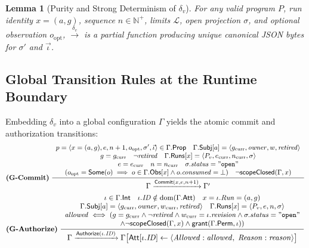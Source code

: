 \documentclass[11pt,a4paper]{article}
\newtheorem{lemma}[theorem]{Lemma}
\theoremstyle{definition}
\theoremstyle{remark}
\newcommand{\Obs}{\mathsf{Obs}}
\newcommand{\Subj}{\mathsf{Subj}}
\begin{document}
\begin{lemma}[Purity and Strong Determinism of $\delta_v$]
\label{lem:determinism}
For any valid program $P$, run identity $x = (a,g)$, sequence $n \in \mathbb{N}^+$, limits $\mathcal{L}$, open projection $\sigma$, and optional observation $o_{\text{opt}}$, $\xrightarrow{\delta_v}$ is a partial function producing unique canonical JSON bytes for $\sigma'$ and $\vec{\iota}$.
\end{lemma}

\subsection{Global Transition Rules at the Runtime Boundary}
Embedding $\delta_v$ into a global configuration $\Gamma$ yields the atomic commit and authorization transitions:
\[
\small\textbf{(G-Commit)} \; \frac{
  \begin{array}{c}
    p = \langle x=(a,g), e, n+1, o_{\text{opt}}, \sigma', \vec{\iota} \rangle \in \Gamma.\mathsf{Prop} \quad \Gamma.\Subj[a] = \langle g_{\text{curr}}, \mathit{owner}, w, \mathit{retired} \rangle \\
    g = g_{\text{curr}} \quad \neg \mathit{retired} \quad \Gamma.\mathsf{Runs}[x] = \langle P_v, e_{\text{curr}}, n_{\text{curr}}, \sigma \rangle \\
    e = e_{\text{curr}} \quad n = n_{\text{curr}} \quad \sigma.\mathit{status} = \mathtt{"open"} \\
    (o_{\text{opt}} = \mathsf{Some}(o) \implies o \in \Gamma.\Obs[x] \land o.\mathit{consumed} = \bot) \quad \neg \mathsf{scopeClosed}(\Gamma, x)
  \end{array}
}{
  \Gamma \xrightarrow{\;\mathsf{Commit}(x, e, n+1)\;} \Gamma'
}
\]
\[
\small\textbf{(G-Authorize)} \; \frac{
  \begin{array}{c}
    \iota \in \Gamma.\mathsf{Int} \quad \iota.\mathit{ID} \notin \operatorname{dom}(\Gamma.\mathsf{Att}) \quad x = \iota.\mathit{Run} = (a, g) \\
    \Gamma.\Subj[a] = \langle g_{\text{curr}}, \mathit{owner}, w_{\text{curr}}, \mathit{retired} \rangle \quad \Gamma.\mathsf{Runs}[x] = \langle P_v, e, n, \sigma \rangle \\
    \mathit{allowed} \iff (g = g_{\text{curr}} \land \neg \mathit{retired} \land w_{\text{curr}} = \iota.\mathit{revision} \land \sigma.\mathit{status} = \mathtt{"open"} \\
    \land \neg \mathsf{scopeClosed}(\Gamma, x) \land \mathsf{grant}(\Gamma.\mathsf{Perm}, \iota))
  \end{array}
}{
  \Gamma \xrightarrow{\;\mathsf{Authorize}(\iota.\mathit{ID})\;} \Gamma\big[\mathsf{Att}[\iota.\mathit{ID}] \leftarrow \langle \mathit{Allowed}: \mathit{allowed},\; \mathit{Reason}: \mathit{reason} \rangle\big]
}
\]
\end{document}

